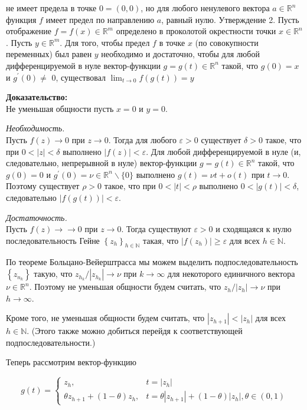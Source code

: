 \documentclass[a4paper,12pt]{article} %
\begin{document}
	не имеет предела в точке $0=(0,0)$, но для любого ненулевого вектора $a \in \mathbb{R}^{n}$ функция $f$ имеет предел по направлению $a$, равный нулю. Утверждение 2. Пусть отображение $f=f(x) \in \mathbb{R}^{m}$ определено в проколотой окрестности точки $x \in \mathbb{R}^{n}$. Пусть $y \in \mathbb{R}^{m}$. Для того, чтобы предел $f$ в точке $x$ (по совокупности переменных) был равен $y$ необходимо и достаточно, чтобы для любой дифференцируемой в нуле вектор-функции $g=g(t) \in \mathbb{R}^{n}$ такой, что $g(0)=x$ и $g^{\prime}(0) \neq$ 0, существовал $\lim _{t \rightarrow 0} f(g(t))=y$
	
	\textbf{Доказательство:\\}
	Не уменьшая общности пусть $x=0$ и $y=0$.
	
	\textit{Необходимость.}\\ Пусть $f(z) \rightarrow 0$ при $z \rightarrow 0$. Тогда для любого $\varepsilon>0$ существует $\delta>0$ такое, что при $0<|z|<\delta$ выполнено $|f(z)|<\varepsilon$. Для любой дифференцируемой в нуле (и, следовательно, непрерывной в нуле) вектор-функции $g=g(t) \in \mathbb{R}^{n}$ такой, что $g(0)=0$ и $g^{\prime}(0)=\nu \in \mathbb{R}^{n} \backslash\{0\}$ выполнено $g(t)=\nu t+o(t)$ при $t \rightarrow 0$. Поэтому существует $\rho>0$ такое, что при $0<|t|<\rho$ выполнено $0<|g(t)|<\delta$, следовательно $|f(g(t))|<\varepsilon$.
	
	\textit{Достаточность.}\\ Пусть $f(z) \rightarrow \rightarrow 0$ при $z \rightarrow 0$. Тогда существуют $\varepsilon>0$ и сходящаяся к нулю последовательность Гейне $\left\{z_{h}\right\}_{h \in \mathbb{N}}$ такая, что $\left|f\left(z_{h}\right)\right| \geq \varepsilon$ для всех $h \in \mathbb{N}$.
	
	По теореме Больцано-Вейерштрасса мы можем выделить подпоследовательность $\left\{z_{n_{k}}\right\}$ такую, что $z_{h_{k}} /\left|z_{h_{k}}\right| \rightarrow \nu$ при $k \rightarrow \infty$ для некоторого единичного вектора $\nu \in \mathbb{R}^{n}$. Поэтому не уменьшая общности будем считать, что $z_{h} /\left|z_{h}\right| \rightarrow \nu$ при $h \rightarrow \infty$.
	
	Кроме того, не уменьшая общности будем считать, что $\left|z_{h+1}\right|<\left|z_{h}\right|$ для всех $h \in \mathbb{N}$. (Этого также можно добиться перейдя к соответствующей подпоследовательности.)
	
	Теперь рассмотрим вектор-функцию
	
	$$
	g(t)= \begin{cases}z_{h}, & t=\left|z_{h}\right| \\ \theta z_{h+1}+(1-\theta) z_{h}, & t=\theta\left|z_{h+1}\right|+(1-\theta)\left|z_{h}\right|, \theta \in(0,1)\end{cases}
	$$
	
\end{document}
